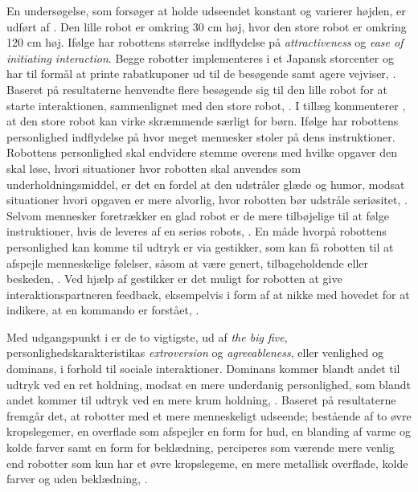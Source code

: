 En undersøgelse, som forsøger at holde udseendet konstant og varierer højden, er udført af \textcite[s. 255]{PDF:RecommendationEffects}. Den lille robot er omkring 30 cm høj, hvor den store robot er omkring 120 cm høj. Ifølge \textcite[s. 255]{PDF:RecommendationEffects} har robottens størrelse indflydelse på \textit{attractiveness} og \textit{ease of initiating interaction}. Begge robotter implementeres i et Japansk storcenter og har til formål at printe rabatkuponer ud til de besøgende samt agere vejviser, \textcite[s. 252]{PDF:RecommendationEffects}. Baseret på resultaterne henvendte flere besøgende sig til den lille robot for at starte interaktionen, sammenlignet med den store robot, \parencite[s. 260]{PDF:RecommendationEffects}. I tillæg kommenterer \textcite[s. 260]{PDF:RecommendationEffects}, at den store robot kan virke skræmmende særligt for børn.\blankline
%
Ifølge \textcite[s. 226]{PDF:SocailAndCollaborative} har robottens personlighed indflydelse på hvor meget mennesker stoler på dens instruktioner. Robottens personlighed skal endvidere stemme overens med hvilke opgaver den skal løse, hvori situationer hvor robotten skal anvendes som underholdningsmiddel, er det en fordel at den udstråler glæde og humor, modsat situationer hvori opgaven er mere alvorlig, hvor robotten bør udstråle seriøsitet, \parencite[s. 226]{PDF:SocailAndCollaborative}. Selvom mennesker foretrækker en glad robot er de mere tilbøjelige til at følge instruktioner, hvis de leveres af en seriøs robots, \parencite[s. 226]{PDF:SocailAndCollaborative}. En måde hvorpå robottens personlighed kan komme til udtryk er via gestikker, som kan få robotten til at afspejle menneskelige følelser, såsom at være genert, tilbageholdende eller beskeden, \parencite[s. 227]{PDF:SocailAndCollaborative}. Ved hjælp af gestikker er det muligt for robotten at give interaktionspartneren feedback, eksempelvis i form af at nikke med hovedet for at indikere, at en kommando er forstået, \parencite[s. 228]{PDF:SocailAndCollaborative}.

Med udgangspunkt i \textcite[s. 272]{PDF:PersonalityOfSocialRobots} er de to vigtigste, ud af \textit{the big five}, personlighedskarakteristikas \textit{extroversion} og \textit{agreeableness}, eller venlighed og dominans, i forhold til sociale interaktioner. Dominans kommer blandt andet til udtryk ved en ret holdning, modsat en mere underdanig personlighed, som blandt andet kommer til udtryk ved en mere krum holdning, \textcite[s. 273]{PDF:PersonalityOfSocialRobots}. Baseret på resultaterne fremgår det, at robotter med et mere menneskeligt udseende; bestående af to øvre kropslegemer, en overflade som afspejler en form for hud, en blanding af varme og kolde farver samt en form for beklædning, perciperes som værende mere venlig end robotter som kun har et øvre kropslegeme, en mere metallisk overflade, kolde farver og uden beklædning, \textcite[s. 275]{PDF:PersonalityOfSocialRobots}.

